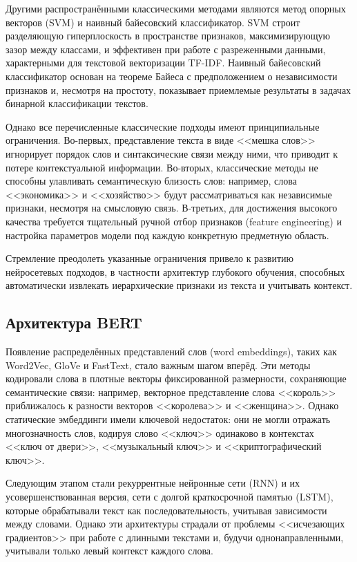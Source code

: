 \documentclass[master, och, coursework]{SCWorks1}
\begin{document}
Другими распространёнными классическими методами являются метод опорных векторов (SVM) и наивный байесовский классификатор. SVM строит разделяющую гиперплоскость в пространстве признаков, максимизирующую зазор между классами, и эффективен при работе с разреженными данными, характерными для текстовой векторизации TF-IDF. Наивный байесовский классификатор основан на теореме Байеса с предположением о независимости признаков и, несмотря на простоту, показывает приемлемые результаты в задачах бинарной классификации текстов.

Однако все перечисленные классические подходы имеют принципиальные ограничения. Во-первых, представление текста в виде <<мешка слов>> игнорирует порядок слов и синтаксические связи между ними, что приводит к потере контекстуальной информации. Во-вторых, классические методы не способны улавливать семантическую близость слов: например, слова <<экономика>> и <<хозяйство>> будут рассматриваться как независимые признаки, несмотря на смысловую связь. В-третьих, для достижения высокого качества требуется тщательный ручной отбор признаков (feature engineering) и настройка параметров модели под каждую конкретную предметную область.

Стремление преодолеть указанные ограничения привело к развитию нейросетевых подходов, в частности архитектур глубокого обучения, способных автоматически извлекать иерархические признаки из текста и учитывать контекст.

	\subsection{Архитектура BERT}
	
Появление распределённых представлений слов (word embeddings), таких как Word2Vec, GloVe и FastText, стало важным шагом вперёд. Эти методы кодировали слова в плотные векторы фиксированной размерности, сохраняющие семантические связи: например, векторное представление слова <<король>> приближалось к разности векторов <<королева>> и <<женщина>>. Однако статические эмбеддинги имели ключевой недостаток: они не могли отражать многозначность слов, кодируя слово <<ключ>> одинаково в контекстах <<ключ от двери>>, <<музыкальный ключ>> и <<криптографический ключ>>.

Следующим этапом стали рекуррентные нейронные сети (RNN) и их усовершенствованная версия, сети с долгой краткосрочной памятью (LSTM), которые обрабатывали текст как последовательность, учитывая зависимости между словами. Однако эти архитектуры страдали от проблемы <<исчезающих градиентов>> при работе с длинными текстами и, будучи однонаправленными, учитывали только левый контекст каждого слова.
\end{document}
